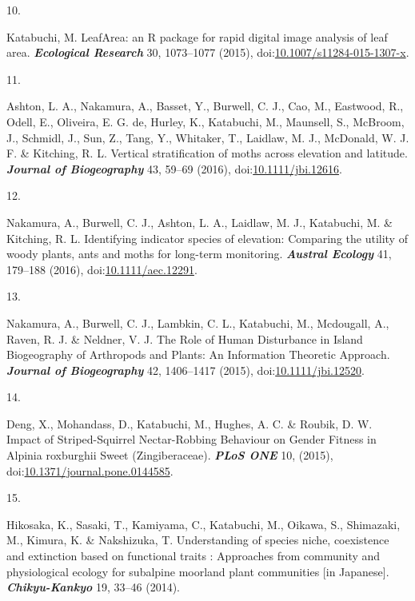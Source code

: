 \documentclass[
]{article}
\newlength{\cslhangindent}
\newlength{\csllabelwidth}
\newlength{\cslentryspacingunit} %
\newenvironment{CSLReferences}[2] %
 {%
  \setlength{\parindent}{0pt}
  \ifodd #1
  \let\oldpar\par
  \def\par{\hangindent=\cslhangindent\oldpar}
  \fi
  \setlength{\parskip}{#2\cslentryspacingunit}
 }%
 {}
\newcommand{\CSLLeftMargin}[1]{\parbox[t]{\csllabelwidth}{#1}}
\newcommand{\CSLRightInline}[1]{\parbox[t]{\linewidth - \csllabelwidth}{#1}\break}
\begin{document}
\begin{CSLReferences}{0}{0}
\leavevmode{}%
\CSLLeftMargin{10. }
\CSLRightInline{Katabuchi, M. {LeafArea: an R package for rapid digital
image analysis of leaf area}. \textbf{\emph{Ecological Research}} 30,
1073--1077 (2015),
doi:\href{https://doi.org/10.1007/s11284-015-1307-x}{10.1007/s11284-015-1307-x}.}

\leavevmode{}%
\CSLLeftMargin{11. }
\CSLRightInline{Ashton, L. A., Nakamura, A., Basset, Y., Burwell, C. J.,
Cao, M., Eastwood, R., Odell, E., Oliveira, E. G. de, Hurley, K.,
Katabuchi, M., Maunsell, S., McBroom, J., Schmidl, J., Sun, Z., Tang,
Y., Whitaker, T., Laidlaw, M. J., McDonald, W. J. F. \& Kitching, R. L.
Vertical stratification of moths across elevation and latitude.
\textbf{\emph{Journal of Biogeography}} 43, 59--69 (2016),
doi:\href{https://doi.org/10.1111/jbi.12616}{10.1111/jbi.12616}.}

\leavevmode{}%
\CSLLeftMargin{12. }
\CSLRightInline{Nakamura, A., Burwell, C. J., Ashton, L. A., Laidlaw, M.
J., Katabuchi, M. \& Kitching, R. L. {Identifying indicator species of
elevation: Comparing the utility of woody plants, ants and moths for
long-term monitoring}. \textbf{\emph{Austral Ecology}} 41, 179--188
(2016),
doi:\href{https://doi.org/10.1111/aec.12291}{10.1111/aec.12291}.}

\leavevmode{}%
\CSLLeftMargin{13. }
\CSLRightInline{Nakamura, A., Burwell, C. J., Lambkin, C. L., Katabuchi,
M., Mcdougall, A., Raven, R. J. \& Neldner, V. J. {The Role of Human
Disturbance in Island Biogeography of Arthropods and Plants: An
Information Theoretic Approach}. \textbf{\emph{Journal of Biogeography}}
42, 1406--1417 (2015),
doi:\href{https://doi.org/10.1111/jbi.12520}{10.1111/jbi.12520}.}

\leavevmode{}%
\CSLLeftMargin{14. }
\CSLRightInline{Deng, X., Mohandass, D., Katabuchi, M., Hughes, A. C. \&
Roubik, D. W. Impact of {Striped}-{Squirrel Nectar}-{Robbing Behaviour}
on {Gender Fitness} in {Alpinia} roxburghii {Sweet} ({Zingiberaceae}).
\textbf{\emph{PLoS ONE}} 10, (2015),
doi:\href{https://doi.org/10.1371/journal.pone.0144585}{10.1371/journal.pone.0144585}.}

\leavevmode{}%
\CSLLeftMargin{15. }
\CSLRightInline{Hikosaka, K., Sasaki, T., Kamiyama, C., Katabuchi, M.,
Oikawa, S., Shimazaki, M., Kimura, K. \& Nakshizuka, T. Understanding of
species niche, coexistence and extinction based on functional traits :
Approaches from community and physiological ecology for subalpine
moorland plant communities {[}in {Japanese}{]}.
\textbf{\emph{Chikyu-Kankyo}} 19, 33--46 (2014).}


\end{CSLReferences}
\end{document}
